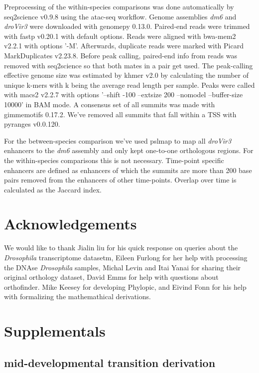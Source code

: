 Preprocessing of the within-species comparisons was done automatically by seq2science v0.9.8\cite{seq2science} using the atac-seq workflow\cite{Choudhary2019}. Genome assemblies \textit{dm6} and \textit{droVir3} were downloaded with genomepy 0.13.0\cite{Frlich2023}. Paired-end reads were trimmed with fastp v0.20.1\cite{Chen2018} with default options. Reads were aligned with bwa-mem2 v2.2.1\cite{bwamem2} with options '-M'. Afterwards, duplicate reads were marked with Picard MarkDuplicates v2.23.8\cite{picard}. Before peak calling, paired-end info from reads was removed with seq2science so that both mates in a pair get used. The peak-calling effective genome size was estimated by khmer v2.0\cite{Crusoe2015} by calculating the number of unique k-mers with k being the average read length per sample. Peaks were called with macs2 v2.2.7\cite{Zhang2008} with options '--shift -100 --extsize 200 --nomodel --buffer-size 10000' in BAM mode. A consensus set of all summits was made with gimmemotifs 0.17.2\cite{gimmemotifs}. We've removed all summits that fall within a TSS with pyranges v0.0.120\cite{Stovner2019}.

For the between-species comparison we've used pslmap to map all \textit{droVir3} enhancers to the \textit{dm6} assembly and only kept one-to-one orthologous regions. For the within-species comparisons this is not necessary. Time-point specific enhancers are defined as enhancers of which the summits are more than 200 base pairs removed from the enhancers of other time-points. Overlap over time is calculated as the Jaccard index.

\section{Acknowledgements}

We would like to thank Jialin liu for his quick response on queries about the \textit{Drosophila} transcriptome datasetm, Eileen Furlong for her help with processing the DNAse \textit{Drosophila} samples, Michal Levin and Itai Yanai for sharing their original orthology dataset, David Emms for help with questions about orthofinder. Mike Keesey for developing Phylopic, and Eivind Fonn for his help with formalizing the mathemathical derivations.

\section{Supplementals}

\subsection{mid-developmental transition derivation}\label{subsection:middevelopmenttransition}

